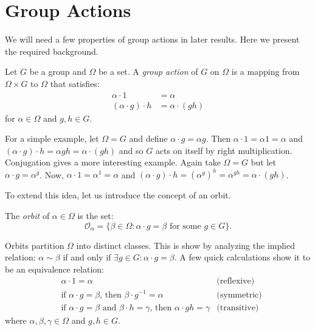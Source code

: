 \documentclass[main.tex]{subfiles}
\begin{document}
\section{Group Actions}

We will need a few properties of group actions in later results. Here we present the required background.

\hss

\begin{definition}
Let $G$ be a group and $\Omega$ be a set. A \emph{group action} of $G$ on $\Omega$ is a mapping from $\Omega \times G$ to $\Omega$ that satisfies:
\begin{align*}
\alpha \cdot 1 &= \alpha \\
(\alpha \cdot g) \cdot h &= \alpha \cdot (gh)
\end{align*}
for $\alpha \in \Omega$ and $g, h \in G$.
\end{definition}

\hss

For a simple example, let $\Omega = G$ and define $\alpha \cdot g = \alpha g$. Then $\alpha \cdot 1 = \alpha 1 = \alpha$ and $(\alpha \cdot g) \cdot h = \alpha g h = \alpha \cdot (gh)$ and so $G$ acts on itself by right multiplication. Conjugation gives a more interesting example. Again take $\Omega = G$ but let $\alpha \cdot g = \alpha^g$. Now, $\alpha \cdot 1 = \alpha^1 = \alpha$ and $(\alpha \cdot g) \cdot h = (\alpha^g)^h = \alpha^{gh} = \alpha \cdot (gh)$.

To extend this idea, let us introduce the concept of an orbit.

\hss

\begin{definition}
The \emph{orbit} of $\alpha \in \Omega$ is the set:
$$\mathcal{O}_\alpha = \{ \beta \in \Omega : \alpha \cdot g = \beta \text{ for some } g \in G \}\text{.}$$
\end{definition}

\hss

Orbits partition $\Omega$ into distinct classes. This is show by analyzing the implied relation: $\alpha \sim \beta$ if and only if $\exists g \in G : \alpha \cdot g = \beta$. A few quick calculations show it to be an equivalence relation:
\begin{align*}
&\alpha \cdot 1 = \alpha &\text{(reflexive)} \\
&\text{if } \alpha \cdot g = \beta \text{, then } \beta \cdot g^{-1} = \alpha &\text{(symmetric)} \\
&\text{if } \alpha \cdot g = \beta \text{ and } \beta \cdot h = \gamma \text{, then } \alpha \cdot gh = \gamma  &\text{(transitive)}
\end{align*}
where $\alpha, \beta, \gamma \in \Omega$ and $g, h \in G$.
\end{document}
